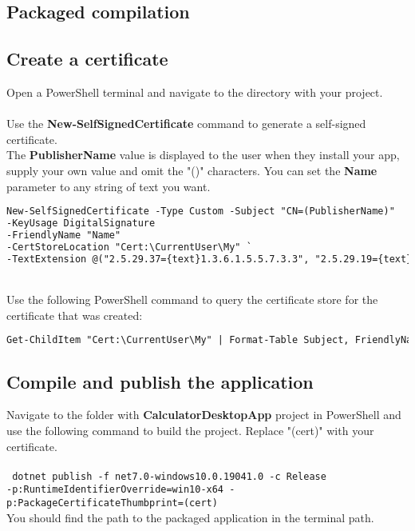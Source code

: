 \subsection{Packaged compilation}

\subsection*{Create a certificate}

Open a PowerShell terminal and navigate to the directory with your project.
\\\\
Use the \textbf{New-SelfSignedCertificate} command to generate a self-signed certificate.
\\
The \textbf{PublisherName} value is displayed to the user when they install your app, supply your own value and omit the "()" characters. You can set the \textbf{Name} parameter to any string of text you want.

\begin{lstlisting}[language=XML]
New-SelfSignedCertificate -Type Custom -Subject "CN=(PublisherName)"
-KeyUsage DigitalSignature
-FriendlyName "Name"
-CertStoreLocation "Cert:\CurrentUser\My" `
-TextExtension @("2.5.29.37={text}1.3.6.1.5.5.7.3.3", "2.5.29.19={text}")
\end{lstlisting}
~\\
Use the following PowerShell command to query the certificate store for the certificate that was created:

\begin{lstlisting}[language=XML]
Get-ChildItem "Cert:\CurrentUser\My" | Format-Table Subject, FriendlyName, Thumbprint
\end{lstlisting}

\subsection*{Compile and publish the application}

Navigate to the folder with \textbf{CalculatorDesktopApp} project in PowerShell and use the following command to build the project. Replace "(cert)" with your certificate.
\\\\
\texttt{
dotnet publish -f net7.0-windows10.0.19041.0 -c Release\\ -p:RuntimeIdentifierOverride=win10-x64 -p:PackageCertificateThumbprint=(cert)
}
\\
You should find the path to the packaged application in the terminal path.


